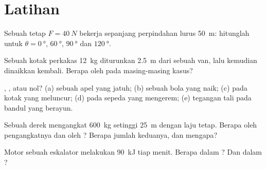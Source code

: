 \section{Latihan}

\begin{exercise}[$\star$]\label{exo:g11:work-of-force:1}
Sebuah  tetap $F = \qty{40}{N}$ bekerja sepanjang perpindahan lurus
\qty{50}{m}: hitunglah  untuk $\theta = \qty{0}{\degree}$,
$\qty{60}{\degree}$, $\qty{90}{\degree}$ dan $\qty{120}{\degree}$.
\end{exercise}

\begin{exercise}[$\star$]\label{exo:g11:work-of-force:2}
Sebuah kotak perkakas \qty{12}{kg} diturunkan \qty{2.5}{m} dari sebuah
van, lalu kemudian dinaikkan kembali. Berapa  oleh  pada
masing-masing kasus?
\end{exercise}

\begin{exercise}[$\star$]\label{exo:g11:work-of-force:3}
, , atau nol? (a)  sebuah apel yang jatuh;
(b)  sebuah bola yang naik; (c)  pada kotak yang
meluncur; (d)  pada sepeda yang mengerem; (e) tegangan tali pada
bandul yang berayun.
\end{exercise}

\begin{exercise}[$\star$]\label{exo:g11:work-of-force:4}
Sebuah derek mengangkat \qty{600}{kg} setinggi \qty{25}{m} dengan laju
tetap. Berapa  oleh  pengangkatnya dan  oleh ?
Berapa jumlah keduanya, dan mengapa?
\end{exercise}

\begin{exercise}[$\star$]\label{exo:g11:work-of-force:5}
Motor sebuah eskalator melakukan  \qty{90}{kJ} tiap menit. Berapa
 dalam ? Dan dalam ?
\end{exercise}


